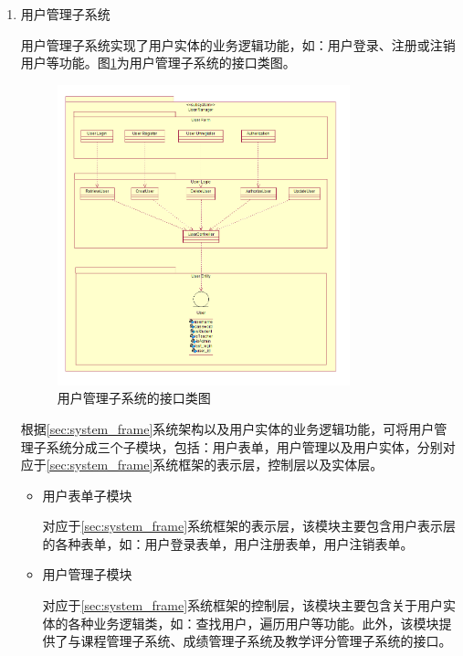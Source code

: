 \begin{enumerate}
  \item 用户管理子系统
  
  \CJKindent 用户管理子系统实现了用户实体的业务逻辑功能，如：用户登录、注册或注销用户等功能。图\ref{fig:subsystem_usermanage_interface}为用户管理子系统的接口类图。
  \begin{figure}[H]
    \centering
    \includegraphics[width=0.8\textwidth]{img/usermgr_interface}
    \caption{用户管理子系统的接口类图}
    \label{fig:subsystem_usermanage_interface}
  \end{figure}
  
  \CJKindent 根据\ref{sec:system_frame}系统架构以及用户实体的业务逻辑功能，可将用户管理子系统分成三个子模块，包括：用户表单，用户管理以及用户实体，分别对应于\ref{sec:system_frame}系统框架的表示层，控制层以及实体层。
  
  \begin{itemize}
    \item 用户表单子模块
    
    \CJKindent 对应于\ref{sec:system_frame}系统框架的表示层，该模块主要包含用户表示层的各种表单，如：用户登录表单，用户注册表单，用户注销表单。
    
    \item 用户管理子模块
    
    \CJKindent 对应于\ref{sec:system_frame}系统框架的控制层，该模块主要包含关于用户实体的各种业务逻辑类，如：查找用户，遍历用户等功能。此外，该模块提供了与课程管理子系统、成绩管理子系统及教学评分管理子系统的接口。
    

\end{itemize}
\end{enumerate}
